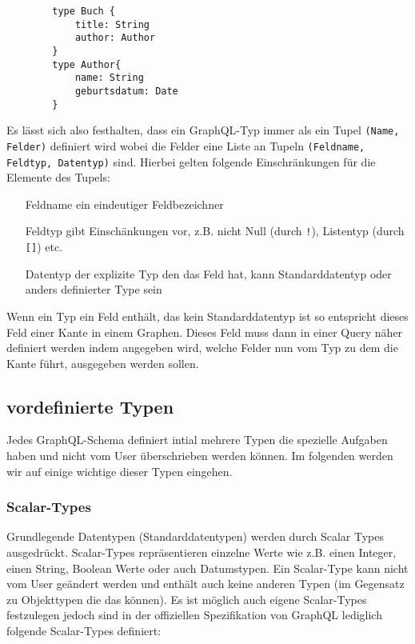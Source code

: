 \begin{center}
    \begin{verbatim}
        type Buch {
            title: String
            author: Author
        }
        type Author{
            name: String
            geburtsdatum: Date
        }
    \end{verbatim}
\end{center}

Es lässt sich also festhalten, dass ein GraphQL-Typ immer als ein Tupel \verb+(Name, Felder)+ definiert wird wobei
die Felder eine Liste an Tupeln \verb+(Feldname, Feldtyp, Datentyp)+ sind.
Hierbei gelten folgende Einschränkungen für die Elemente des Tupels:

\begin{center}
    \begin{itemize}
        \item[Feldname] ein eindeutiger Feldbezeichner
        \item[Feldtyp] gibt Einschänkungen vor, z.B. nicht Null (durch \verb+!+), Listentyp (durch \verb+[]+) etc.
        \item[Datentyp] der explizite Typ den das Feld hat, kann Standarddatentyp oder anders definierter Type sein
    \end{itemize}
\end{center}

Wenn ein Typ ein Feld enthält, das kein Standarddatentyp ist so entspricht dieses Feld einer Kante in einem Graphen.
Dieses Feld muss dann in einer Query näher definiert werden indem angegeben wird, welche Felder nun vom Typ zu dem die
Kante führt, ausgegeben werden sollen.

\subsection{vordefinierte Typen}

Jedes GraphQL-Schema definiert intial mehrere Typen die spezielle Aufgaben haben und nicht vom User überschrieben werden können.
Im folgenden werden wir auf einige wichtige dieser Typen eingehen.

\subsubsection{Scalar-Types}

Grundlegende Datentypen (Standarddatentypen) werden durch Scalar Types ausgedrückt. Scalar-Types repräsentieren einzelne Werte
wie z.B. einen Integer, einen String, Boolean Werte oder auch Datumstypen.
Ein Scalar-Type kann nicht vom User geändert werden und enthält auch keine anderen Typen (im Gegensatz zu Objekttypen die das können).
Es ist möglich auch eigene Scalar-Types festzulegen jedoch sind in der offiziellen Spezifikation von GraphQL
lediglich folgende Scalar-Types definiert:

